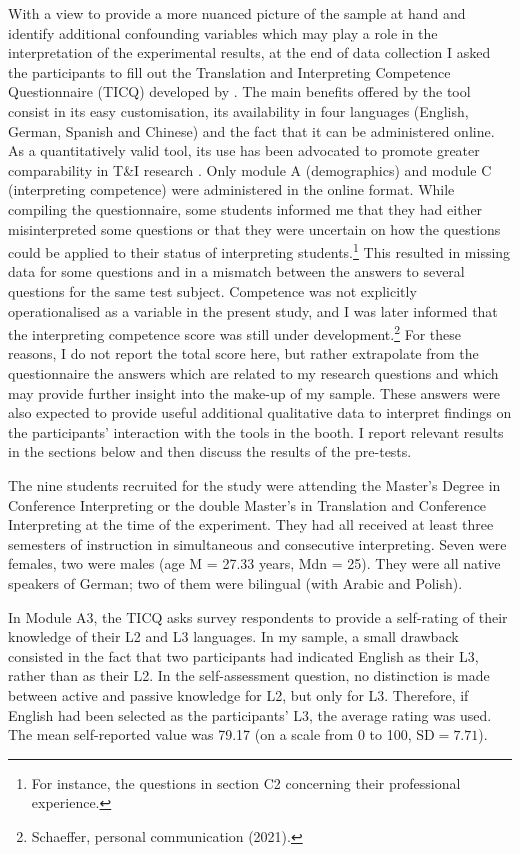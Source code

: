 With a view to provide a more nuanced picture of the sample at hand and identify additional confounding variables which may play a role in the interpretation of the experimental results, at the end of data collection I asked the participants to fill out the Translation and Interpreting Competence Questionnaire (TICQ) developed by \citet{schaeffer_translation_2020}. The main benefits offered by the tool consist in its easy customisation, its availability in four languages (English, German, Spanish and Chinese) and the fact that it can be administered online. As a quantitatively valid tool, its use has been advocated to promote greater comparability in T\&I research \citep[102]{schaeffer_translation_2020}. Only module A (demographics) and module C (interpreting competence) were administered in the online format. While compiling the questionnaire, some students informed me that they had either misinterpreted some questions or that they were uncertain on how the questions could be applied to their status of interpreting students.\footnote{For instance, the questions in section C2 concerning their professional experience.} This resulted in missing data for some questions and in a mismatch between the answers to several questions for the same test subject. Competence was not explicitly operationalised as a variable in the present study, and I was later informed that the interpreting competence score was still under development.\footnote{Schaeffer, personal communication (2021).} For these reasons, I do not report the total score here, but rather extrapolate from the questionnaire the answers which are related to my research questions and which may provide further insight into the make-up of my sample. These answers were also expected to provide useful additional qualitative data to interpret findings on the participants' interaction with the tools in the booth. I report relevant results in the sections below and then discuss the results of the pre-tests.

 \label{demog_MS}
The nine students recruited for the study were attending the Master's Degree in Conference Interpreting or the double Master's in Translation and Conference Interpreting at the time of the experiment. They had all received at least three semesters of instruction in simultaneous and consecutive interpreting. Seven were females, two were males (age M = 27.33 years, Mdn = 25). They were all native speakers of German; two of them were bilingual (with Arabic and Polish).

 \label{lang_prof_MS}
In Module A3, the TICQ asks survey respondents to provide a self-rating of their knowledge of their L2 and L3 languages. In my sample, a small drawback consisted in the fact that two participants had indicated English as their L3, rather than as their L2. In the self-assessment question, no distinction is made between active and passive knowledge for L2, but only for L3. Therefore, if English had been selected as the participants' L3, the average rating was used. The mean self-reported value was 79.17 (on a scale from 0 to 100, $\text{SD}=7.71$).

